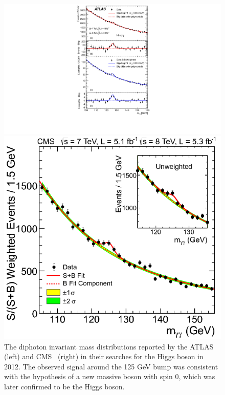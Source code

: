 \begin{figure}[tbh!]
 \begin{center}
 \begin{minipage}[b]{0.5\linewidth} 
 \includegraphics[width=\textwidth]{figures/Part1/Field/ATLAS} 
 \vspace{1em}
 \end{minipage}
 \hfill
 \begin{minipage}[b]{0.45\linewidth} 
 \includegraphics[width=\textwidth]{figures/Part1/Field/CMS}
 \end{minipage}
 \caption{The diphoton invariant mass distributions reported by the \ac{ATLAS}~\cite{ATLAS:2012yve} (left) and \ac{CMS}~\cite{CMS:2012qbp} (right) in their searches for the Higgs boson in 2012. The observed signal around the 125 GeV bump was consistent with the hypothesis of a new massive boson with spin 0, which was later confirmed to be the Higgs boson.}
 \label{fig:Hgg}
 \end{center}
\end{figure}